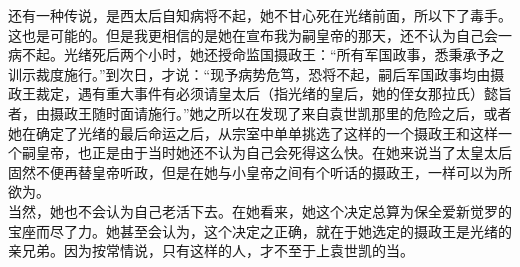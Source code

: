 还有一种传说，是西太后自知病将不起，她不甘心死在光绪前面，所以下了毒手。这也是可能的。但是我更相信的是她在宣布我为嗣皇帝的那天，还不认为自己会一病不起。光绪死后两个小时，她还授命监国摄政王：“所有军国政事，悉秉承予之训示裁度施行。”到次日，才说：“现予病势危笃，恐将不起，嗣后军国政事均由摄政王裁定，遇有重大事件有必须请皇太后（指光绪的皇后，她的侄女那拉氏）懿旨者，由摄政王随时面请施行。”她之所以在发现了来自袁世凯那里的危险之后，或者她在确定了光绪的最后命运之后，从宗室中单单挑选了这样的一个摄政王和这样一个嗣皇帝，也正是由于当时她还不认为自己会死得这么快。在她来说当了太皇太后固然不便再替皇帝听政，但是在她与小皇帝之间有个听话的摄政王，一样可以为所欲为。\\

当然，她也不会认为自己老活下去。在她看来，她这个决定总算为保全爱新觉罗的宝座而尽了力。她甚至会认为，这个决定之正确，就在于她选定的摄政王是光绪的亲兄弟。因为按常情说，只有这样的人，才不至于上袁世凯的当。\\
